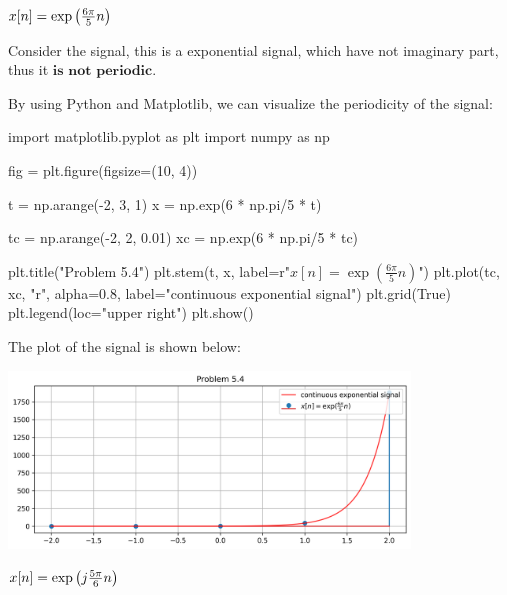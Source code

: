\documentclass[a4paper, 10pt]{article}
\begin{document}
\newpage

\begin{subproblems}[start=4]
    \item \( x[n] = \exp \left( \frac{6\pi}{5}n \right) \)
\end{subproblems}

\begin{solution}

Consider the signal, this is a exponential signal, which have not imaginary part, thus it \( \boxed{\textbf{is not periodic}} \).

\vspace{5mm}

By using Python and Matplotlib, we can visualize the periodicity of the signal:
\begin{codingbox}
import matplotlib.pyplot as plt
import numpy as np

fig = plt.figure(figsize=(10, 4))

t = np.arange(-2, 3, 1)
x = np.exp(6 * np.pi/5 * t)

tc = np.arange(-2, 2, 0.01)
xc = np.exp(6 * np.pi/5 * tc)

plt.title("Problem 5.4")
plt.stem(t, x, label=r"$x[n] = \exp(\frac{6\pi}{5}n)$")
plt.plot(tc, xc, "r", alpha=0.8, label="continuous exponential signal")
plt.grid(True)
plt.legend(loc="upper right")
plt.show()
\end{codingbox}

The plot of the signal is shown below:
\begin{center}
    \includegraphics[width=0.8\textwidth]{images/problem_5_4.png}
\end{center}
\end{solution}

\newpage

\begin{subproblems}[start=5]
    \item \( x[n] = \exp \left( j\frac{5\pi}{6}n \right) \)
\end{subproblems}
\end{document}
